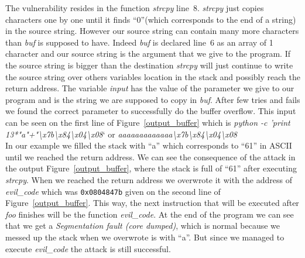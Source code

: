 \documentclass[11pt]{sdm}
\begin{document}
The vulnerability resides in the function \textit{strcpy} line~8. \textit{strcpy} just copies characters one by one until it finds ``0''(which corresponds to the end of a string) in the source string. However our source string can contain many more characters than \textit{buf} is supposed to have. 
Indeed \textit{buf} is declared line~6 as an array of 1 character and our source string is the argument that we give to the program.
If the source string is bigger than the destination \textit{strcpy} will just continue to write the source string over others variables location in the stack and possibly reach the return address.
The variable \textit{input} has the value of the parameter we give to our program and is the string we are supposed to copy in \textit{buf}.
After few tries and fails we found the correct parameter to successfully do the buffer overflow. This input can be seen on the first line of Figure~\ref{output_buffer} which is \textit{python -c 'print 13*"a"+"\textbackslash{x7b}\textbackslash{x84}\textbackslash{x04}\textbackslash{x08}}` or \textit{aaaaaaaaaaaaa\textbackslash{x7b}\textbackslash{x84}\textbackslash{x04}\textbackslash{x08}}\\
In our example we filled the stack with ``a'' which corresponds to ``61'' in ASCII until we reached the return address.
We can see the consequence of the attack in the output Figure~\ref{output_buffer}, where the stack is full of ``61'' after executing \textit{strcpy}.
When we reached the return address we overwrote it with the address of \textit{evil\_code} which was \texttt{0x0804847b} given on the second line of Figure~\ref{output_buffer}.
This way, the next instruction that will be executed after \textit{foo} finishes will be the function \textit{evil\_code}.
At the end of the program we can see that we get a \textit{Segmentation fault (core dumped)}, which is normal because we messed up the stack when we overwrote is with ``a''. But since we managed to execute \textit{evil\_code} the attack is still successful.
\end{document}
